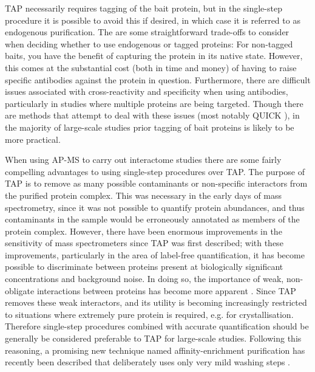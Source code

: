 \documentclass[a4paper,11pt,twoside,openright]{scrbook}
\begin{document}
TAP necessarily requires tagging of the bait protein, but in the single-step procedure it is possible to avoid this if desired, in which case it is referred to as endogenous purification. The are some straightforward trade-offs to consider when deciding whether to use endogenous or tagged proteins: For non-tagged baits, you have the benefit of capturing the protein in its native state. However, this comes at the substantial cost (both in time and money) of having to raise specific antibodies against the protein in question. Furthermore, there are difficult issues associated with cross-reactivity and specificity when using antibodies, particularly in studies where multiple proteins are being targeted. Though there are methods that attempt to deal with these issues (most notably QUICK \cite{Selbach2006}), in the majority of large-scale studies prior tagging of bait proteins is likely to be more practical.

When using AP-MS to carry out interactome studies there are some fairly compelling advantages to using single-step procedures over TAP. The purpose of TAP is to remove as many possible contaminants or non-specific interactors from the purified protein complex. This was necessary in the early days of mass spectrometry, since it was not possible to quantify protein abundances, and thus contaminants in the sample would be erroneously annotated as members of the protein complex. However, there have been enormous improvements in the sensitivity of mass spectrometers since TAP was first described; with these improvements, particularly in the area of label-free quantification, it has become possible to discriminate between proteins present at biologically significant concentrations and background noise. In doing so, the importance of weak, non-obligate interactions between proteins has become more apparent \cite{Perkins2010a,Hein2015}. Since TAP removes these weak interactors, and its utility is becoming increasingly restricted to situations where extremely pure protein is required, e.g. for crystallisation. Therefore single-step procedures combined with accurate quantification should be generally be considered preferable to TAP for large-scale studies. Following this reasoning, a promising new technique named affinity-enrichment purification has recently been described that deliberately uses only very mild washing steps \cite{Keilhauer2015}.
\end{document}
